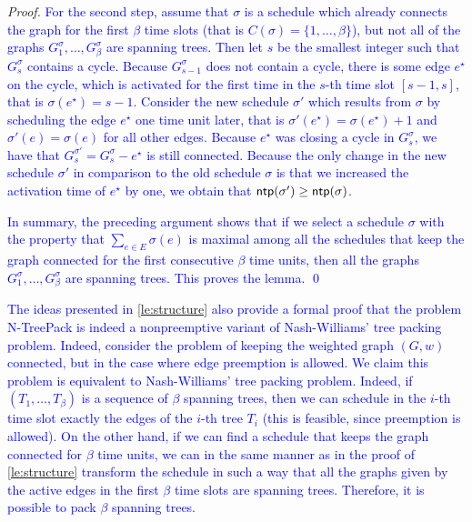 \documentclass[runningheads]{llncs}
\newcommand{\set}[1]{\{ #1 \}}
\newcommand{\fromto}[2]{\set{#1, \ldots, #2}}
\newcommand{\xxxNTP}{{\sc N-TreePack}}
\DeclareMathOperator{\ntp}{\text{\sf ntp}}
\newcommand{\lasse}[1]{\textcolor{blue}{#1}}
\begin{document}
\begin{proof}
\lasse{
For the second step, assume that $\sigma$ is a schedule which already connects the graph for the first $\beta$ time slots (that is $C(\sigma) = \fromto{1}{\beta}$), but not all of the graphs $G^\sigma_1,\dots,G^\sigma_\beta$ are spanning trees. 
Then let $s$ be the smallest integer such that $G^\sigma_s$ contains a cycle.
 Because $G^\sigma_{s-1}$ does not contain a cycle, there is some edge $e^\star$ on the cycle, which is activated for the first time in the $s$-th time slot $[s-1, s]$, that is $\sigma(e^\star) = s-1$. 
Consider the new schedule $\sigma'$ which results from $\sigma$ by scheduling the edge $e^\star$ one time unit later, that is $\sigma'(e^\star) = \sigma(e^\star) + 1$ and $\sigma'(e) = \sigma(e)$ for all other edges. 
Because $e^\star$ was closing a cycle in $G^\sigma_s$, we have that $G^{\sigma'}_s = G^\sigma_s - e^\star$ is still connected.
 Because the only change in the new schedule $\sigma'$ in comparison to the old schedule $\sigma$ is that we increased the activation time of $e^\star$ by one, we obtain that $\ntp(\sigma') \geq \ntp(\sigma)$.} 

\lasse{
In summary, the preceding argument shows that if we select a schedule $\sigma$ with the property that $\sum_{e \in E}\sigma(e)$ is maximal among all the schedules that keep the graph connected for the first consecutive $\beta$ time units, then all the graphs $G^\sigma_1,\dots,G^\sigma_\beta$ are spanning trees. This proves the lemma. \qed
}
\end{proof}

\lasse{The ideas presented in \cref{le:structure} also provide a formal proof that the problem {\xxxNTP} is indeed a nonpreemptive variant of Nash-Williams' tree packing problem. 
Indeed, consider the problem of keeping the weighted graph $(G, w)$ connected, but in the case where edge preemption is allowed. We claim this problem is equivalent to Nash-Williams' tree packing problem.
 Indeed, if $(T_1,\dots,T_\beta)$ is a sequence of $\beta$ spanning trees, then we can schedule in the $i$-th time slot exactly the edges of the $i$-th tree $T_i$ 
(this is feasible, since preemption is allowed). 
On the other hand, if we can find a schedule that keeps the graph connected for $\beta$ time units, we can in the same manner as in the proof of \cref{le:structure} transform the schedule in such a way that all the graphs given by the active edges in the first $\beta$ time slots are spanning trees. 
Therefore, it is possible to pack $\beta$ spanning trees.  }
\end{document}
